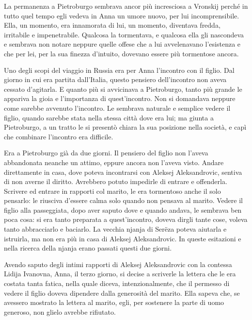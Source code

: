 La permanenza a Pietroburgo sembrava ancor più incresciosa a Vronskij perché in tutto quel tempo egli vedeva in Anna un umore nuovo, per lui incomprensibile. Ella, un momento, era innamorata di lui, un momento, diventava fredda, irritabile e impenetrabile. Qualcosa la tormentava, e qualcosa ella gli nascondeva e sembrava non notare neppure quelle offese che a lui avvelenavano l'esistenza e che per lei, per la sua finezza d'intuito, dovevano essere più tormentose ancora. 

Uno degli scopi del viaggio in Russia era per Anna l'incontro con il figlio. Dal giorno in cui era partita dall'Italia, questo pensiero dell'incontro non aveva cessato d'agitarla. E quanto più si avvicinava a Pietroburgo, tanto più grande le appariva la gioia e l'importanza di quest'incontro. Non si domandava neppure come sarebbe avvenuto l'incontro. Le sembrava naturale e semplice vedere il figlio, quando sarebbe stata nella stessa città dove era lui; ma giunta a Pietroburgo, a un tratto le si presentò chiara la sua posizione nella società, e capì che combinare l'incontro era difficile. 

Era a Pietroburgo già da due giorni. Il pensiero del figlio non l'aveva abbandonata neanche un attimo, eppure ancora non l'aveva visto. Andare direttamente in casa, dove poteva incontrarsi con Aleksej Aleksandrovic, sentiva di non averne il diritto. Avrebbero potuto impedirle di entrare e offenderla. Scrivere ed entrare in rapporti col marito, le era tormentoso anche il solo pensarlo: le riusciva d'essere calma solo quando non pensava al marito. Vedere il figlio alla passeggiata, dopo aver saputo dove e quando andava, le sembrava ben poca cosa: si era tanto preparata a quest'incontro, doveva dirgli tante cose, voleva tanto abbracciarlo e baciarlo. La vecchia njanja di Serëza poteva aiutarla e istruirla, ma non era più in casa di Aleksej Aleksandrovic. In queste esitazioni e nella ricerca della njanja erano passati questi due giorni. 

Avendo saputo degli intimi rapporti di Aleksej Aleksandrovic con la contessa Lidija Ivanovna, Anna, il terzo giorno, si decise a scriverle la lettera che le era costata tanta fatica, nella quale diceva, intenzionalmente, che il permesso di vedere il figlio doveva dipendere dalla generosità del marito. Ella sapeva che, se avessero mostrato la lettera al marito, egli, per sostenere la parte di uomo generoso, non glielo avrebbe rifiutato. 

